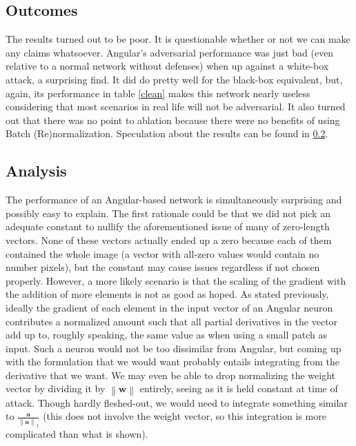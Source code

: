 \subsection{Outcomes}

The results turned out to be poor. It is questionable whether or not we can make any claims
whatsoever. Angular's adversarial performance was just bad (even relative to a normal network
without defenses) when up against a white-box attack, a surprising find. It did do pretty well for
the black-box equivalent, but, again, its performance in table \ref{clean} makes this network nearly
useless considering that most scenarios in real life will not be adversarial. It also turned out
that there was no point to ablation because there were no benefits of using Batch (Re)normalization.
Speculation about the results can be found in \ref{analysis}.


\subsection{Analysis}
\label{analysis}

The performance of an Angular-based network is simultaneously surprising and possibly easy to
explain. The first rationale could be that we did not pick an adequate constant to nullify the
aforementioned issue of many of zero-length vectors. None of these vectors actually ended up a zero
because each of them contained the whole image (a vector with all-zero values would contain no
number pixels), but the constant may cause issues regardless if not chosen properly. However, a more
likely scenario is that the scaling of the gradient with the addition of more elements is not as
good as hoped. As stated previously, ideally the gradient of each element in the input vector of an
Angular neuron contributes a normalized amount such that all partial derivatives in the vector add
up to, roughly speaking, the same value as when using a small patch as input. Such a neuron would
not be too dissimilar from Angular, but coming up with the formulation that we would want probably
entails integrating from the derivative that we want. We may even be able to drop normalizing the
weight vector by dividing it by $\left\| \mathbf{w} \right\|$ entirely, seeing as it is held
constant at time of attack. Though hardly fleshed-out, we would need to integrate something similar
to $\frac{\mathbf{a}}{\left\| \mathbf{a} \right\|_1}$ (this does not involve the weight vector, so
this integration is more complicated than what is shown).

